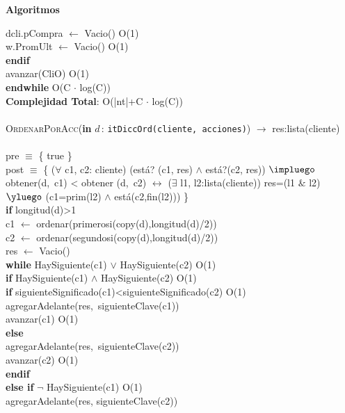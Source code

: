 \documentclass[10pt, a4paper]{article}
\let\NombreFuncion=\textsc
\let\TipoVariable=\texttt
\let\ModificadorArgumento=\textbf
\newcommand{\tab}{\hspace*{7mm}}
\newcommand{\In}[2]{\ModificadorArgumento{in} \ensuremath{#1}\,: \TipoVariable{#2}\xspace}
\newenvironment{Algoritmos}{%
  \vspace*{2ex}%
  \noindent\textbf{\Large Algoritmos}%
  \vspace*{2ex}%
}{}
\begin{document}
\begin{Algoritmos}
\tab \tab \tab dcli.pCompra $\leftarrow$ Vacio() \hfill O(1)
\\
\tab \tab \tab w.PromUlt $\leftarrow$ Vacio() \hfill O(1)
\\
\tab \tab \textbf{endif}
\\
\tab \tab avanzar(CliO) \hfill O(1)
\\
\tab \textbf{endwhile} \hfill O(C $\cdot$ log(C))
\\
\textbf{Complejidad Total}: O(|nt|+C $\cdot$ log(C))
\\ \\
\NombreFuncion{OrdenarPorAcc}(\In{d}{itDiccOrd(cliente,\ acciones)}) $\rightarrow$ res:lista(cliente)\\ 
\\
pre $\equiv$ \{ true \}
\\
post $\equiv$ \{ ($\forall$ c1, c2: cliente) (est\'{a}? (c1, res) $\wedge$ est\'{a}?(c2, res)) $\impluego$ obtener(d,\ c1) < obtener (d,\ c2) $\leftrightarrow$ ($\exists$ l1, l2:lista(cliente)) res=(l1 $\&$ l2) $\yluego$ (c1=prim(l2) $\wedge$ est\'{a}(c2,fin(l2))) \} 
\\
\tab \textbf{if} longitud(d)>1
\\
\tab c1 $\leftarrow$ ordenar(primerosi(copy(d),longitud(d)/2))
\\
\tab c2 $\leftarrow$ ordenar(segundosi(copy(d),longitud(d)/2))
\\
\tab res $\leftarrow$ Vacio()
\\
\tab \textbf{while} HaySiguiente(c1) $\vee$ HaySiguiente(c2) \hfill O(1)
\\
\tab \tab \textbf{if} HaySiguiente(c1) $\wedge$ HaySiguiente(c2) \hfill O(1)
\\
\tab \tab \tab \textbf{if} siguienteSignificado(c1)<siguienteSignificado(c2) \hfill O(1)
\\
\tab \tab \tab \tab agregarAdelante(res,\ siguienteClave(c1))
\\
\tab \tab \tab \tab avanzar(c1) \hfill O(1)
\\
\tab \tab \tab \textbf{else}
\\
\tab \tab \tab \tab agregarAdelante(res,\ siguienteClave(c2))
\\
\tab \tab \tab \tab avanzar(c2) \hfill O(1)
\\
\tab \tab \tab \textbf{endif}
\\
\tab \tab \textbf{else if} $\neg$ HaySiguiente(c1) \hfill O(1)
\\
\tab \tab \tab agregarAdelante(res, siguienteClave(c2))
\\

\end{Algoritmos}
\end{document}
